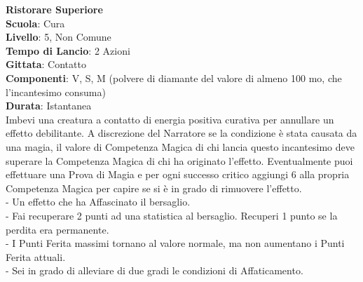 \begin{multicols}{2}
\medskip\textbf{Ristorare Superiore}\\
\textbf{Scuola}: Cura\\
\textbf{Livello}: 5, Non Comune\\
\textbf{Tempo di Lancio}: 2 Azioni\\
\textbf{Gittata}: Contatto\\
\textbf{Componenti}: V, S, M (polvere di diamante del valore di almeno 100 mo, che l'incantesimo consuma)\\
\textbf{Durata}: Istantanea\\
Imbevi una creatura a contatto di energia positiva curativa per annullare un effetto debilitante.
A discrezione del Narratore se la condizione è stata causata da una magia, il valore di Competenza Magica di chi lancia questo incantesimo deve superare la Competenza Magica di chi ha originato l'effetto.
Eventualmente puoi effettuare una Prova di Magia e per ogni successo critico aggiungi 6 alla propria Competenza Magica per capire se si è in grado di rimuovere l'effetto.\\

- Un effetto che ha Affascinato il bersaglio.\\
- Fai recuperare 2 punti ad una statistica al bersaglio. Recuperi 1 punto se la perdita era permanente.\\
- I Punti Ferita massimi tornano al valore normale, ma non aumentano i Punti Ferita attuali.\\
- Sei in grado di alleviare di due gradi le condizioni di Affaticamento.


\end{multicols}
